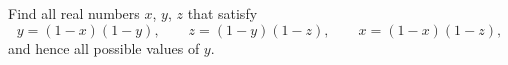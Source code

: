 Find all real numbers $x$, $y$, $z$ that satisfy
\[
y=(1-x)(1-y),\qquad z=(1-y)(1-z),\qquad x=(1-x)(1-z),
\]
and hence all possible values of $y$.
